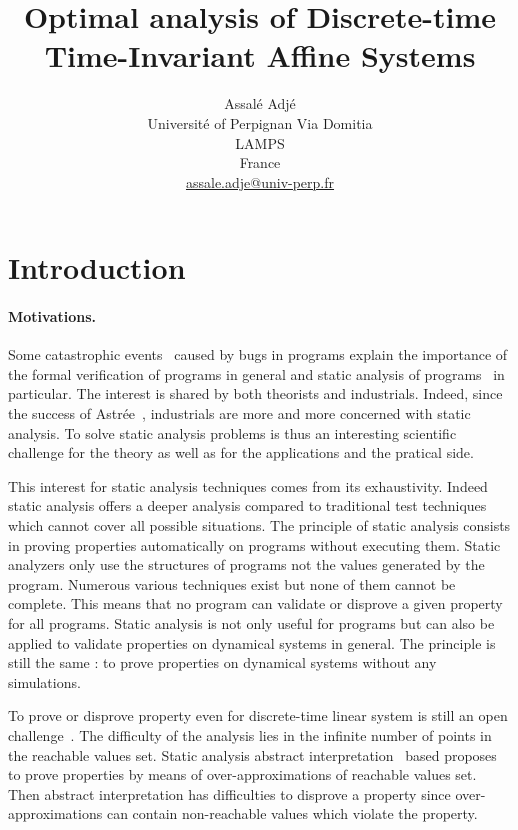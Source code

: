 \documentclass[10pt]{article}
\title{Optimal analysis of Discrete-time Time-Invariant Affine Systems}
\author{Assalé Adjé\\
Université of Perpignan Via Domitia\\
LAMPS\\
France\\
\url{assale.adje@univ-perp.fr}
}
\date{}%
\begin{document}
\maketitle
\begin{abstract}
    
\end{abstract}

\section{Introduction}
\paragraph{Motivations.}
Some catastrophic events~\cite{johnson2005natural,mcquaid2012software} caused by bugs in programs explain the importance of the formal verification of programs in general and static analysis of programs~\cite{cousot2010gentle} in particular. The interest is shared by both theorists and industrials. Indeed, since the success of Astrée~\cite{delmas2007astree,souyris2007experimental,bouissou2009space}, industrials are  more and more concerned with static analysis.  To solve static analysis problems is thus an interesting scientific challenge for the theory as well as for the applications and the pratical  side.   

This interest for static analysis techniques comes from its exhaustivity. Indeed static analysis offers a deeper analysis compared to traditional test techniques which cannot cover all possible situations. The principle of static analysis consists in proving properties automatically on programs without executing them. Static analyzers only use the structures of programs not the values generated by the program.  Numerous various techniques exist but none of them cannot be complete. This means that no program can validate or disprove a given property for all programs. Static analysis is not only useful for programs but can also be applied to validate properties on dynamical systems in general. The principle is still the same : to prove properties on dynamical systems without any simulations.

To prove or disprove property even for discrete-time linear system is still an open challenge~\cite{acceleration-popl14,7403149,DBLP:conf/icalp/AlmagorCO018}.  The difficulty of the analysis lies in the infinite number of points in the reachable values set. Static analysis abstract interpretation~\cite{cousot2001abstract} based proposes to prove properties by means of over-approximations of reachable values set. Then abstract interpretation has difficulties to disprove a property since over-approximations can contain non-reachable values which violate the property. 
\end{document}
